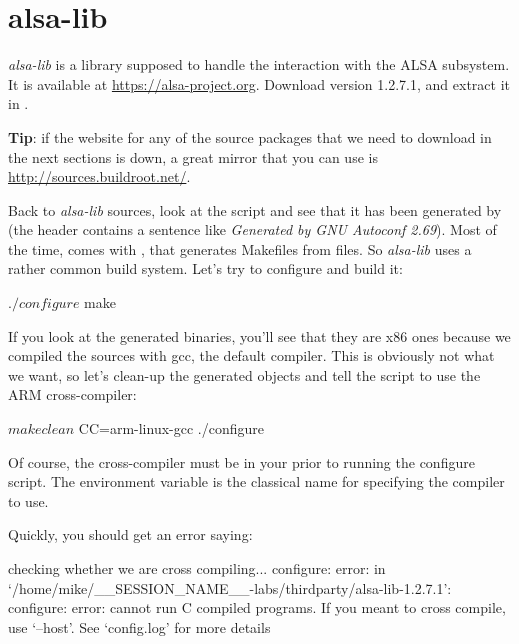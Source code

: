 \section{alsa-lib}

{\em alsa-lib} is a library supposed to handle the interaction with
the ALSA subsystem. It is available at \url{https://alsa-project.org}.
Download version 1.2.7.1, and extract it
in .

{\bf Tip}: if the website for any of the source packages that we
need to download in the next sections is down, a great mirror
that you can use is \url{http://sources.buildroot.net/}.

Back to {\em alsa-lib} sources, look at the  script
and see that it has been generated by  (the header
contains a sentence like {\em Generated by GNU Autoconf 2.69}). Most of
the time,  comes with , that generates
Makefiles from  files. So {\em alsa-lib} uses a rather
common build system. Let's try to configure and build it:

\begin{bashinput}
$ ./configure
$ make
\end{bashinput}

If you look at the generated binaries, you'll see that they are
x86 ones because we compiled the sources with gcc, the default compiler.
This is obviously not what we want, so let's clean-up the generated objects
and tell the  script to use the ARM cross-compiler:

\begin{bashinput}
$ make clean
$ CC=arm-linux-gcc ./configure
\end{bashinput}

Of course, the  cross-compiler must be in your
 prior to running the configure script. The  environment
variable is the classical name for specifying the compiler to
use.

Quickly, you should get an error saying:

\begin{terminaloutput}
checking whether we are cross compiling... configure: error: in `/home/mike/__SESSION_NAME__-labs/thirdparty/alsa-lib-1.2.7.1':
configure: error: cannot run C compiled programs.
If you meant to cross compile, use `--host'.
See `config.log' for more details
\end{terminaloutput}
\normalsize

